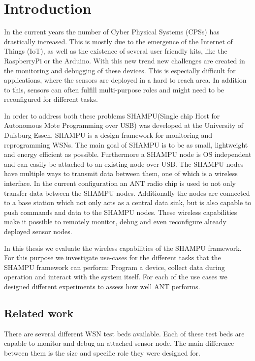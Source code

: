 \chapter{Introduction}
\label{sec:intro}
In the current years the number of Cyber Physical Systems (CPSs) has drastically increased. This is mostly due to the emergence of the Internet of Things (IoT), as well as the existence of several user friendly kits, like the RaspberryPi or the Arduino. With this new trend new challenges are created in the monitoring and debugging of these devices. This is especially difficult for applications, where the sensors are deployed in a hard to reach area. In addition to this, sensors can often fulfill multi-purpose roles and might need to be reconfigured for different tasks.

In order to address both these problems SHAMPU(Single chip Host for Autonomous Mote Programming over USB)\cite{smeets2014demonstration} was developed at the University of Duisburg-Essen. SHAMPU is a design framework for monitoring and reprogramming WSNs. The main goal of SHAMPU is to be as small, lightweight and energy efficient as possible. Furthermore a SHAMPU node is OS independent and can easily be attached to an existing node over USB. The SHAMPU nodes have multiple ways to transmit data between them, one of which is a wireless interface. In the current configuration an ANT\cite{DynastreamInnovationsInc.2013} radio chip is used to not only transfer data between the SHAMPU nodes. Additionally the nodes are connected to a base station which not only acts as a central data sink, but is also capable to push commands and data to the SHAMPU nodes. These wireless capabilities make it possible to remotely monitor, debug and even reconfigure already deployed sensor nodes. 

In this thesis we evaluate the wireless capabilities of the SHAMPU framework. For this purpose we investigate use-cases for the different tasks that the SHAMPU framework can perform: Program a device, collect data during operation and interact with the system itself. For each of the use cases we designed different experiments to assess how well ANT performs.
\newpage


\section{Related work}
\label{sec:related_work}
There are several different WSN test beds available. Each of these test beds are capable to monitor and debug an attached sensor node. The main difference between them is the size and specific role they were designed for. 

